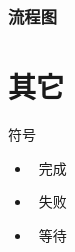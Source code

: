 \documentclass{./banyuan-ppt}
\begin{document}
\subsubsection{流程图}

\section{其它}
\begin{frame}{符号}
    \begin{itemize}
        \item \CheckedBox \  完成
        \item \XBox \  失败 
        \item \Square \  等待
    \end{itemize}
\end{frame}

\createlastpage
\end{document}
